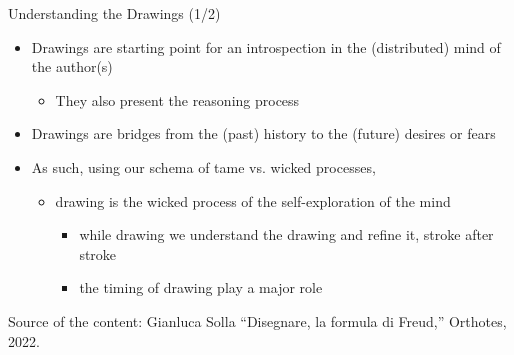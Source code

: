 \documentclass{beamer}
\begin{document}
\begin{frame}
{\centerline{Understanding the Drawings (1/2)}}
 
\begin{itemize}
   \item Drawings are starting point for an introspection in the (distributed) mind of the author(s)
\begin{itemize}
   \item They also present the reasoning process
 \end{itemize} 
      \item Drawings are bridges from the (past) history to the (future) desires or fears
 \item As such, using our schema of tame vs. wicked processes,
 \begin{itemize}
   \item  drawing is the wicked process of the self-exploration of the mind
  \begin{itemize}
   \item while drawing we understand the drawing and refine it, stroke after stroke
   \item the timing of drawing play a major role
    \end{itemize} 
      \end{itemize} 

 \end{itemize} 

\begin{center}
\tiny
Source of the content: Gianluca Solla ``Disegnare, la formula di Freud,'' Orthotes, 2022.
\end{center}
\end{frame}
\end{document}
